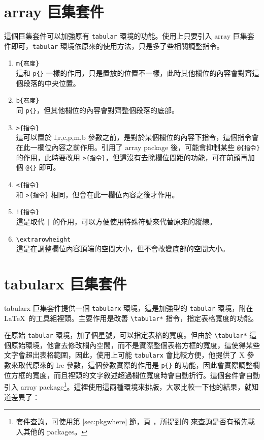\section{array 巨集套件}
\label{sec:array}

這個巨集套件可以加強原有 \texttt{tabular} 環境的功能。使用上只要引入 \textsf{array} 巨集套件即可，\texttt{tabular} 環境依原來的使用方法，只是多了些相關調整指令。

\begin{enumerate}
  \item \verb|m{寬度}|\\
        這和 \verb|p{}| 一樣的作用，只是置放的位置不一樣，此時其他欄位的內容會對齊這個段落的中央位置。
  \item \verb|b{寬度}|\\
        同 \verb|p{}|，但其他欄位的內容會對齊整個段落的底部。
  \item \verb|>{指令}|\\
        這可以置於 {\ttfamily l,r,c,p,m,b} 參數之前，是對於某個欄位的內容下指令，這個指令會在此一欄位內容之前作用。引用了 \textsf{array} package 後，可能會抑制某些 \verb|@{指令}| 的作用，此時要改用 \verb|>{指令}|，但這沒有去除欄位間距的功能，可在前頭再加個 \verb|@{}| 即可。
  \item \verb|<{指令}|\\
        和 \verb|>{指令}| 相同，但會在此一欄位內容之後才作用。
  \item \verb|!{指令}|\\
        這是取代 \verb+|+ 的作用，可以方便使用特殊符號來代替原來的縱線。
  \item \verb|\extrarowheight|\\
        這是在調整欄位內容頂端的空間大小，但不會改變底部的空間大小。
\end{enumerate}


\section{tabularx 巨集套件}
\label{sec:tabularx}

\textsf{tabularx} 巨集套件提供一個 \texttt{tabularx} 環境，這是加強型的 \texttt{tabular} 環境，附在 \LaTeX\ 的工具組裡頭。主要作用是改善 \verb|\tabular*| 指令，指定表格寬度的功能。

在原始 \texttt{tabular} 環境，加了個星號，可以指定表格的寬度。但由於 \verb|\tabular*| 這個原始環境，他會去修改欄內空間，而不是實際整個表格方框的寬度，這使得某些文字會超出表格範圍，因此，使用上可能 \texttt{tabularx} 會比較方便，他提供了 {\ttfamily X} 參數來取代原來的 {\ttfamily lrc} 參數，這個參數實際的作用是 \verb|p{}| 的功能，因此會實際調整欄位方框的寬度，而且裡頭的文字敘述超過欄位寬度時會自動折行。這個套件會自動引入 \textsf{array} package\footnote{套件查詢，可使用第 \ref{sec:pkgwhere} 節，頁 \pageref{sec:pkgwhere}，所提到的
  來查詢是否有預先載入其他的 package{s}。}。這裡使用這兩種環境來排版，大家比較一下他的結果，就知道差異了：

